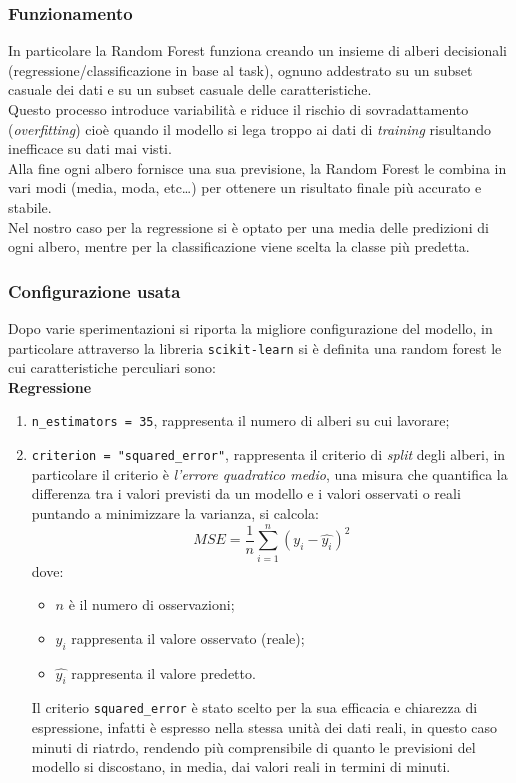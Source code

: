 \documentclass[italian,12pt,a4paper]{article}
\begin{document}
			\subsubsection{Funzionamento}
				In particolare la Random Forest funziona creando un insieme di alberi decisionali (regressione/classificazione in base al task), ognuno addestrato su un subset casuale dei dati e su un subset casuale delle caratteristiche.\\
				Questo processo introduce variabilità e riduce il rischio di sovradattamento (\textit{overfitting}) cioè quando il modello si lega troppo ai dati di \textit{training} risultando inefficace su dati mai visti.\\ 
				Alla fine ogni albero fornisce una sua previsione, la Random Forest le combina in vari modi (media, moda, etc\dots) per ottenere un risultato finale più accurato e stabile.\\
				\linebreak
				Nel nostro caso per la regressione si è optato per una media delle predizioni di ogni albero, mentre per la classificazione viene scelta la classe più predetta.
			\subsubsection{Configurazione usata}
				Dopo varie sperimentazioni si riporta la migliore configurazione del modello, in particolare attraverso la libreria \texttt{scikit-learn} \cite{scikit_learn} si è definita una random forest le cui caratteristiche perculiari sono:\\
				\linebreak
				\textbf{Regressione}
				 
					\begin{enumerate}
						
						\item \texttt{n\_estimators = 35}, rappresenta il numero di alberi su cui lavorare;
						\item  \texttt{criterion = "squared\_error"},  rappresenta il criterio di \textit{split} degli alberi, in particolare il criterio è \textit{l'errore quadratico medio}, una misura che quantifica la differenza tra i valori previsti da un modello e i valori osservati o reali puntando a minimizzare la varianza, si calcola:
							$$MSE = \frac{1}{n}\sum_{i = 1}^{n}(y_i - \hat{y_i})^2$$
						dove:
							\begin{itemize}
								\item $n$ è il numero di osservazioni;
								\item $y_i$ rappresenta il valore osservato (reale);
								\item $\hat{y_i}$ rappresenta il valore predetto.
							\end{itemize}
			
						Il criterio \texttt{squared\_error} è stato scelto per la sua efficacia e chiarezza di espressione, infatti è espresso nella stessa unità dei dati reali, in questo caso minuti di riatrdo, rendendo più comprensibile di quanto le previsioni del modello si discostano, in media, dai valori reali in termini di minuti.
					
					\end{enumerate}
		
\end{document}
